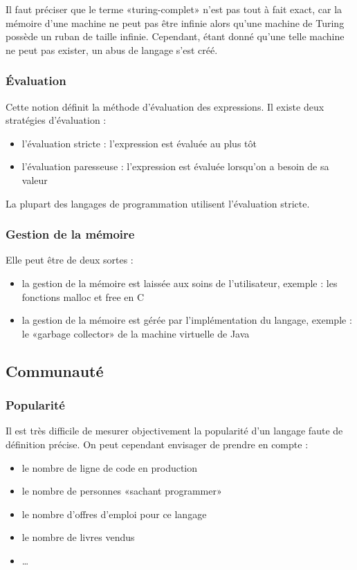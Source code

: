 Il faut préciser que le terme «turing-complet» n'est pas tout à fait exact, car la mémoire d'une machine ne peut pas être infinie alors qu'une machine de Turing possède un ruban de taille infinie. Cependant, étant donné qu'une telle machine ne peut pas exister, un abus de langage s'est créé.

\subsubsection{Évaluation}
\label{evaluation}

Cette notion définit la méthode d'évaluation des expressions. Il existe deux stratégies d'évaluation :
\begin{itemize}
\item l'évaluation stricte : l'expression est évaluée au plus tôt
\item l'évaluation paresseuse : l'expression est évaluée lorsqu'on a besoin de sa valeur\\
\end{itemize}

La plupart des langages de programmation utilisent l'évaluation stricte.

\subsubsection{Gestion de la mémoire}
\label{memoire}

Elle peut être de deux sortes :
\begin{itemize}
\item la gestion de la mémoire est laissée aux soins de l'utilisateur, exemple : les fonctions malloc et free en C
\item la gestion de la mémoire est gérée par l'implémentation du langage, exemple : le «garbage collector» de la machine virtuelle de Java
\end{itemize}

\subsection{Communauté}
\label{communaute}

\subsubsection{Popularité}
\label{popularite}

Il est très difficile de mesurer objectivement la popularité d'un langage faute de définition précise. On peut cependant envisager de prendre en compte :
\begin{itemize}
\item le nombre de ligne de code en production
\item le nombre de personnes «sachant programmer»
\item le nombre d'offres d'emploi pour ce langage
\item le nombre de livres vendus
\item …\\
\end{itemize}

